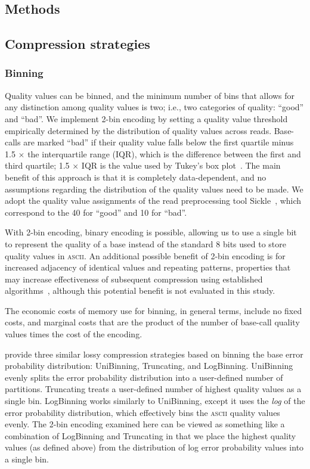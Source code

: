 \documentclass{bioinfo}
\begin{document}
\begin{methods}
\section{Methods}

\subsection{Compression strategies}

\subsubsection{Binning}

Quality values can be binned, and the minimum number of bins that
allows for any distinction among quality values is two; i.e., two
categories of quality: ``good'' and ``bad''. We implement 2-bin
encoding by setting a quality value threshold empirically determined
by the distribution of quality values across reads. Base-calls are
marked ``bad'' if their quality value falls below the first quartile
minus 1.5 $\times$ the interquartile range (IQR), which is the
difference between the first and third quartile; 1.5 $\times$ IQR is
the value used by Tukey's box plot~\citep{mcgill1978variations}. The
main benefit of this approach is that it is completely data-dependent,
and no assumptions regarding the distribution of the quality values
need to be made. We adopt the quality value assignments of the read
preprocessing tool Sickle~\citep{sickle}, which correspond to the 40
for ``good'' and 10 for ``bad''.
 
With 2-bin encoding, binary encoding is possible, allowing us to use a
single bit to represent the quality of a base instead of the standard
8 bits used to store quality values in \textsc{ascii}. An additional
possible benefit of 2-bin encoding is for increased adjacency of
identical values and repeating patterns, properties that may increase
effectiveness of subsequent compression using established
algorithms~\cite[e.g.,][]{HUFFMAN:1952nr,Ziv77auniversal,
  DBLP:journals/tit/ZivL78}, although this potential benefit is not
evaluated in this study.

The economic costs of memory use for binning, in general terms,
include no fixed costs, and marginal costs that are the product of the
number of base-call quality values times the cost of the encoding.

\cite{Wan:2012kq} provide three similar lossy compression strategies
based on binning the base error probability distribution: UniBinning,
Truncating, and LogBinning. UniBinning evenly splits the error
probability distribution into a user-defined number of partitions.
Truncating treats a user-defined number of highest quality values as a
single bin. LogBinning works similarly to UniBinning, except it uses
the \emph{log} of the error probability distribution, which
effectively bins the \textsc{ascii} quality values evenly. The 2-bin
encoding examined here can be viewed as something like a combination
of LogBinning and Truncating in that we place the highest quality
values (as defined above) from the distribution of log error
probability values into a single bin.


\end{methods}
\end{document}
